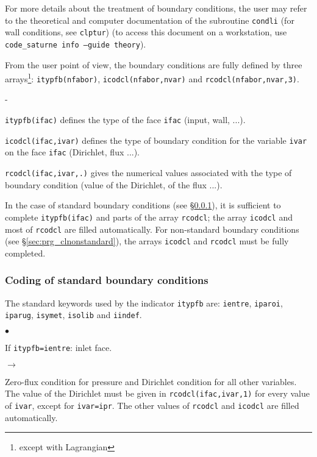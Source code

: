 {{{For more details about the treatment of boundary conditions, the user
may refer to the theoretical and computer documentation \cite{theory} of
the subroutine \texttt{condli} (for wall conditions, see
\texttt{clptur}) (to access this document on a workstation, use
\mbox{\texttt{code\_saturne~info --guide theory}}).

From the user point of view, the boundary conditions are fully
defined by three arrays\footnote{except with Lagrangian}:
\texttt{itypfb(nfabor)},
\texttt{icodcl(nfabor,nvar)} and
\texttt{rcodcl(nfabor,nvar,3)}.
\begin{list}{-}{}
\item \texttt{itypfb(ifac)} defines the type of the face \texttt{ifac}
      (input, wall, ...).
\item \texttt{icodcl(ifac,ivar)} defines the type of boundary
      condition for the variable \texttt{ivar} on the face \texttt{ifac}
      (Dirichlet, flux ...).
\item \texttt{rcodcl(ifac,ivar,.)} gives the numerical values associated with the
      type of boundary condition (value of the Dirichlet, of the flux ...).
\end{list}

In the case of standard boundary conditions (see
\S\ref{sec:prg_clstandard}), it is sufficient to complete \texttt{itypfb(ifac)} and
parts of the array \texttt{rcodcl}; the array \texttt{icodcl} and most of \texttt{rcodcl} are filled automatically. For non-standard boundary
conditions (see \S\ref{sec:prg_clnonstandard}), the arrays \texttt{icodcl} and
\texttt{rcodcl} must be fully completed.

\subsubsection{Coding of standard boundary conditions}
\label{sec:prg_clstandard}%
The standard keywords used by the indicator \texttt{itypfb} are:
\texttt{ientre}, \texttt{iparoi},
\texttt{iparug}, \texttt{isymet},
\texttt{isolib} and \texttt{iindef}.

\begin{list}{$\bullet$}{}
\item If \texttt{itypfb=ientre}: inlet face.

\begin{list}{$\rightarrow$}{}
\item Zero-flux condition for pressure and Dirichlet condition for all
      other variables. The value of the Dirichlet must be given in
      \texttt{rcodcl(ifac,ivar,1)} for every value of \texttt{ivar}, except for
      \texttt{ivar=ipr}. The other values of \texttt{rcodcl} and
      \texttt{icodcl} are filled automatically.
\end{list}


\end{list}}}}
